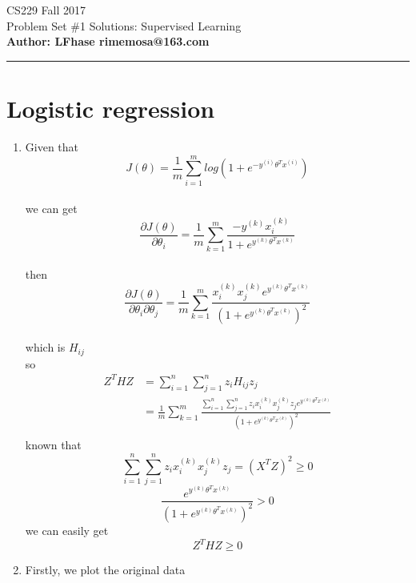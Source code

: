 \documentclass[12pt]{article}
\begin{document}
    \begin{flushleft}
    \LARGE CS229 Fall 2017\\
    \LARGE Problem Set \#1 Solutions: Supervised Learning\\
    \textbf{\normalsize Author: LFhase \quad rimemosa@163.com}
    \end{flushleft} 
    \noindent
    \rule{\linewidth}{0.4pt}


    \section*{Logistic regression  }

    \begin{enumerate}[label=(\alph*)]

    \item 
    {
        Given that 
        $$J(\theta)= \frac{1}{m} \sum_{i=1}^{m}log(1+e^{-y^{(i)}\theta^{T}x^{(i)}})$$\\
        we can get
        $$\frac{\partial J(\theta)}{\partial \theta_{i}}
            =  \frac{1}{m} \sum_{k=1}^{m} \frac{-y^{(k)}x^{(k)}_i}{1+e^{y^{(k)}\theta^{T}x^{(k)}}}
        $$\\
        then
        $$\frac{\partial J(\theta)}{\partial \theta_{i} \partial \theta_{j}}
            =  \frac{1}{m} \sum_{k=1}^{m} 
            \frac{x^{(k)}_ix^{(k)}_je^{y^{(k)}\theta^{T}x^{(k)}}}
            {(1+e^{y^{(k)}\theta^{T}x^{(k)}})^2}
        $$\\
        which is $ H_{ij} $\\
        so
        \begin{equation*} 
        \begin{split}
            Z^THZ &= \sum_{i=1}^n \sum_{j=1}^n z_iH_{ij}z_j \\
            &= \frac{1}{m} \sum_{k=1}^{m} 
            \frac{\sum_{i=1}^n \sum_{j=1}^n z_ix^{(k)}_ix^{(k)}_jz_je^{y^{(k)}\theta^{T}x^{(k)}}}{(1+e^{y^{(k)}\theta^{T}x^{(k)}})^2}
            \\
        \end{split}
        \end{equation*} 
        known that 
        $$ \sum_{i=1}^n \sum_{j=1}^n z_ix^{(k)}_ix^{(k)}_jz_j = (X^TZ)^2 \geq 0 $$
        $$ \frac{e^{y^{(k)}\theta^{T}x^{(k)}}}{(1+e^{y^{(k)}\theta^{T}x^{(k)}})^2} > 0 $$
        we can easily get $$ Z^THZ \geq 0 $$
    }
    \newpage
    \item 
    {
        Firstly, we plot the original data

}
\end{enumerate}
\end{document}

